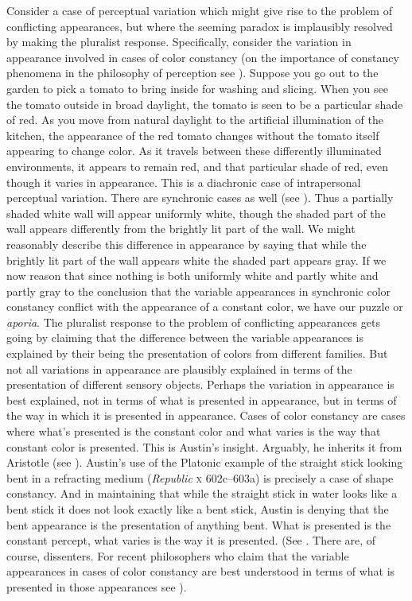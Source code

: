 \documentclass[12pt]{article}
\begin{document}
Consider a case of perceptual variation which might give rise to the problem of conflicting appearances, but where the seeming paradox is implausibly resolved by making the pluralist response. Specifically, consider the variation in appearance involved in cases of color constancy (on the importance of constancy phenomena in the philosophy of perception see \citealt{Smith:2002sa,Burge:2010uq}). Suppose you go out to the garden to pick a tomato to bring inside for washing and slicing. When you see the tomato outside in broad daylight, the tomato is seen to be a particular shade of red. As you move from natural daylight to the artificial illumination of the kitchen, the appearance of the red tomato changes without the tomato itself appearing to change color. As it travels between these differently illuminated environments, it appears to remain red, and that particular shade of red, even though it varies in appearance. This is a diachronic case of intrapersonal perceptual variation. There are synchronic cases as well (see \citealt{Arend:1986aa,Cohen:2008hc}). Thus a partially shaded white wall will appear uniformly white, though the shaded part of the wall appears differently from the brightly lit part of the wall. We might reasonably describe this difference in appearance by saying that while the brightly lit part of the wall appears white the shaded part appears gray. If we now reason that since nothing is both uniformly white and partly white and partly gray to the conclusion that the variable appearances in synchronic color constancy conflict with the appearance of a constant color, we have our puzzle or \emph{aporia}. The pluralist response to the problem of conflicting appearances gets going by claiming that the difference between the variable appearances is explained by their being the presentation of colors from different families. But not all variations in appearance are plausibly explained in terms of the presentation of different sensory objects. Perhaps the variation in appearance is best explained, not in terms of what is presented in appearance, but in terms of the way in which it is presented in appearance. Cases of color constancy are cases where what's presented is the constant color and what varies is the way that constant color is presented. This is Austin's \citeyearpar{Austin:1962lr} insight. Arguably, he inherits it from Aristotle (see \citealt{Kalderon:2015fr}). Austin's use of the Platonic example of the straight stick looking bent in a refracting medium (\emph{Republic} \textsc{x} 602c--603a) is precisely a case of shape constancy. And in maintaining that while the straight stick in water looks like a bent stick it does not look exactly like a bent stick, Austin is denying that the bent appearance is the presentation of anything bent. What is presented is the constant percept, what varies is the way it is presented. (See \citealt{Chisholm:1957dq,Kalderon:2010fj}. There are, of course, dissenters. For recent philosophers who claim that the variable appearances in cases of color constancy are best understood in terms of what is presented in those appearances see \citealt{Noe:2004fk,Chalmers:2006kx}).
\end{document}
